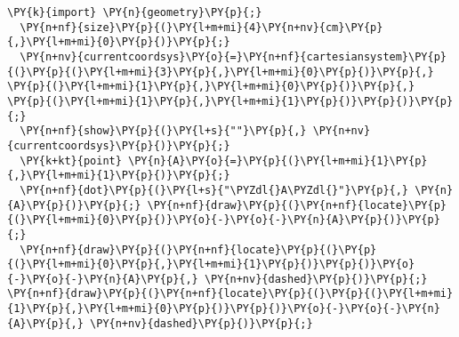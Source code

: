 \begin{Verbatim}[commandchars=\\\{\}]
  \PY{k}{import} \PY{n}{geometry}\PY{p}{;}
  \PY{n+nf}{size}\PY{p}{(}\PY{l+m+mi}{4}\PY{n+nv}{cm}\PY{p}{,}\PY{l+m+mi}{0}\PY{p}{)}\PY{p}{;}
  \PY{n+nv}{currentcoordsys}\PY{o}{=}\PY{n+nf}{cartesiansystem}\PY{p}{(}\PY{p}{(}\PY{l+m+mi}{3}\PY{p}{,}\PY{l+m+mi}{0}\PY{p}{)}\PY{p}{,} \PY{p}{(}\PY{l+m+mi}{1}\PY{p}{,}\PY{l+m+mi}{0}\PY{p}{)}\PY{p}{,} \PY{p}{(}\PY{l+m+mi}{1}\PY{p}{,}\PY{l+m+mi}{1}\PY{p}{)}\PY{p}{)}\PY{p}{;}
  \PY{n+nf}{show}\PY{p}{(}\PY{l+s}{""}\PY{p}{,} \PY{n+nv}{currentcoordsys}\PY{p}{)}\PY{p}{;}
  \PY{k+kt}{point} \PY{n}{A}\PY{o}{=}\PY{p}{(}\PY{l+m+mi}{1}\PY{p}{,}\PY{l+m+mi}{1}\PY{p}{)}\PY{p}{;}
  \PY{n+nf}{dot}\PY{p}{(}\PY{l+s}{"\PYZdl{}A\PYZdl{}"}\PY{p}{,} \PY{n}{A}\PY{p}{)}\PY{p}{;} \PY{n+nf}{draw}\PY{p}{(}\PY{n+nf}{locate}\PY{p}{(}\PY{l+m+mi}{0}\PY{p}{)}\PY{o}{-}\PY{o}{-}\PY{n}{A}\PY{p}{)}\PY{p}{;}
  \PY{n+nf}{draw}\PY{p}{(}\PY{n+nf}{locate}\PY{p}{(}\PY{p}{(}\PY{l+m+mi}{0}\PY{p}{,}\PY{l+m+mi}{1}\PY{p}{)}\PY{p}{)}\PY{o}{-}\PY{o}{-}\PY{n}{A}\PY{p}{,} \PY{n+nv}{dashed}\PY{p}{)}\PY{p}{;} \PY{n+nf}{draw}\PY{p}{(}\PY{n+nf}{locate}\PY{p}{(}\PY{p}{(}\PY{l+m+mi}{1}\PY{p}{,}\PY{l+m+mi}{0}\PY{p}{)}\PY{p}{)}\PY{o}{-}\PY{o}{-}\PY{n}{A}\PY{p}{,} \PY{n+nv}{dashed}\PY{p}{)}\PY{p}{;}
\end{Verbatim}
